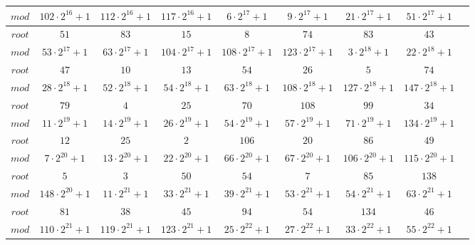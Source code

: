 \documentclass[a4paper,12pt]{article}
\begin{document}
\begin{tabular}{|c|c|c|c|c|c|c|c|c|}
$mod$& $102\cdot 2^{16}+1$& $112\cdot 2^{16}+1$& $117\cdot 2^{16}+1$& $6\cdot 2^{17}+1$& $9\cdot 2^{17}+1$& $21\cdot 2^{17}+1$& $51\cdot 2^{17}+1$\\
\hline

$root$& $51$& $83$& $15$& $8$& $74$& $83$& $43$\\
\hline


$mod$& $53\cdot 2^{17}+1$& $63\cdot 2^{17}+1$& $104\cdot 2^{17}+1$& $108\cdot 2^{17}+1$& $123\cdot 2^{17}+1$& $3\cdot 2^{18}+1$& $22\cdot 2^{18}+1$\\
\hline

$root$& $47$& $10$& $13$& $54$& $26$& $5$& $74$\\
\hline


$mod$& $28\cdot 2^{18}+1$& $52\cdot 2^{18}+1$& $54\cdot 2^{18}+1$& $63\cdot 2^{18}+1$& $108\cdot 2^{18}+1$& $127\cdot 2^{18}+1$& $147\cdot 2^{18}+1$\\
\hline

$root$& $79$& $4$& $25$& $70$& $108$& $99$& $34$\\
\hline


$mod$& $11\cdot 2^{19}+1$& $14\cdot 2^{19}+1$& $26\cdot 2^{19}+1$& $54\cdot 2^{19}+1$& $57\cdot 2^{19}+1$& $71\cdot 2^{19}+1$& $134\cdot 2^{19}+1$\\
\hline

$root$& $12$& $25$& $2$& $106$& $20$& $86$& $49$\\
\hline


$mod$& $7\cdot 2^{20}+1$& $13\cdot 2^{20}+1$& $22\cdot 2^{20}+1$& $66\cdot 2^{20}+1$& $67\cdot 2^{20}+1$& $106\cdot 2^{20}+1$& $115\cdot 2^{20}+1$\\
\hline

$root$& $5$& $3$& $50$& $54$& $7$& $85$& $138$\\
\hline


$mod$& $148\cdot 2^{20}+1$& $11\cdot 2^{21}+1$& $33\cdot 2^{21}+1$& $39\cdot 2^{21}+1$& $53\cdot 2^{21}+1$& $54\cdot 2^{21}+1$& $63\cdot 2^{21}+1$\\
\hline

$root$& $81$& $38$& $45$& $94$& $54$& $134$& $46$\\
\hline


$mod$& $110\cdot 2^{21}+1$& $119\cdot 2^{21}+1$& $123\cdot 2^{21}+1$& $25\cdot 2^{22}+1$& $27\cdot 2^{22}+1$& $33\cdot 2^{22}+1$& $55\cdot 2^{22}+1$\\
\hline


\end{tabular}
\end{document}
